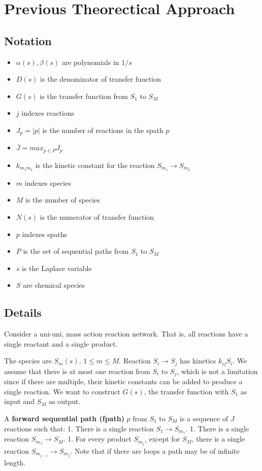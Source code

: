 \documentclass[unnumsec,webpdf,contemporary,large]{oup-authoring-template}%
\theoremstyle{thmstyleone}%
\theoremstyle{thmstyletwo}%
\theoremstyle{thmstylethree}%
\begin{document}
\section{Previous Theorectical Approach}
\subsection{Notation}
\begin{itemize}
\item $\alpha(s), \beta(s)$ are polynomials in $1/s$
\item $D(s)$ is the denominator of transfer function
\item $G(s)$ is the transfer function from $S_1$ to $S_M$
\item $j$ indexes reactions
\item $J_p = |p|$ is the number of reactions in the spath $p$
\item $\bar{J} = max_{p \in P} J_p$
\item $k_{m_1 m_2}$ is the kinetic constant for the reaction $S_{m_1} \rightarrow S_{m_2}$
\item $m$ indexes species
\item $M$ is the number of species
\item $N(s)$ is the numerator of transfer function
\item $p$ indexes spaths
\item $P$ is the set of sequential paths from $S_1$ to $S_M$
\item $s$ is the Laplace variable
\item $S$ are chemical species
\end{itemize}

\subsection{Details}
Consider a uni-uni, mass action reaction network. That is, all reactions have a single reactant and a single product.

The species are $S_m (s)$, $1 \leq m \leq M$. Reaction $S_i \rightarrow S_j$ has kinetics $k_{ij} S_i$. We assume that there is at most one reaction from $S_i$ to $S_j$, which is not a limitation since if there are multiple, their kinetic constants can be added to produce a single reaction. We want to construct $G(s)$, the transfer function with $S_1$ as input and $S_M$ as output.

A \textbf{forward sequential path (fpath)} $p$ from $S_1$ to $S_M$ is a sequence of $J$ reactions such that:
  1. There is a single reaction $S_1 \rightarrow S_{m_1}$.
  1. There is a single reaction $S_{m_{J}} \rightarrow S_M$.
  1. For every product $S_{m_j}$, except for $S_M$, there is a single reaction $S_{m_{j-1}} \rightarrow S_{m_j}$.
Note that if there are loops a path may be of infinite length.
\end{document}
